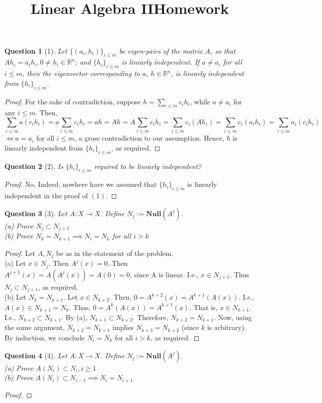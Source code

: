 \documentclass[11pt]{article}
\title{\vspace{-50pt}
\Huge \name
\\\vspace{20pt}
\huge Linear Algebra II\hfill Homework \hw}
\author{}
\date{}
\theoremstyle{quest}
\newtheorem*{question}{Question}
\begin{document}
\maketitle

\begin{question}[1]
Let $\{(a_i, h_i)\}_{i \le m}$ be eigen-pairs of the matrix $A$, so that $Ah_i = a_i h_i, 0 \ne h_i \in \mathbb{R}^n$; and $\{h_i\}_{i \le m}$ is linearly independent. If $a \ne a_i$ for all $i \le m$, then the eigenvector corresponding to $a$, $h \in \mathbb{R}^n$, is linearly independent from $\{h_i\}_{i \le m}$.
\end{question}
\begin{proof}
  For the sake of contradiction, suppose $h = \sum_{i \le m} c_i h_i$, while $a \ne a_i$ for any $i \le m$. Then,
  $$\sum_{i \le m} a (c_i h_i) = a \sum_{i \le m} c_i h_i = ah = Ah = A \sum_{i \le m} c_i h_i = \sum_{i \le m} c_i (A h_i) = \sum_{i \le m} c_i (a_i h_i) = \sum_{i \le m} a_i (c_i h_i)$$ $\iff a = a_i$ for all $i \le m$, a gross contradiction to our assumption. Hence, $h$ is linearly independent from $\{h_i\}_{i \le m}$, as required.
\end{proof}

\begin{question}[2]
Is $\{h_i\}_{i \le m}$ required to be linearly independent?
\end{question}
\begin{proof}
  No. Indeed, nowhere have we assumed that $\{h_i\}_{i \le m}$ is linearly independent in the proof of $(1)$.
\end{proof}

\begin{question}[3]
Let $A: X \rightarrow X$. Define $N_j := \mathbf{Null}(A^j)$.
\\(a) Prove $N_j \subset N_{j+1}$
\\(b) Prove $N_k = N_{k+1} \implies N_i = N_k$ for all $i > k$
\end{question}
\begin{proof}
  Let $A, N_j$ be as in the statement of the problem.
  \\(a) Let $x \in N_j$. Then $A^j(x) = 0$. Then $A^{j+1}(x) = A(A^j(x)) = A(0) = 0$, since A is linear. I.e., $x \in N_{j+1}$. Thus $N_j \subset N_{j+1}$, as required.
  \\(b) Let $N_k = N_{k+1}$. Let $x \in N_{k+2}$. Then, $0 = A^{k+2}(x) = A^{k+1}(A(x))$. I.e., $A(x) \in N_{k+1} = N_k$. Thus, $0 = A^k(A(x)) = A^{k+1}(x)$. That is, $x \in N_{k+1}$. I.e., $N_{k+2} \subset N_{k+1}$. By (a), $N_{k+1} \subset N_{k+2}$. Therefore, $N_{k+2} = N_{k+1}$. Now, using the same argument, $N_{k+2} = N_{k+1}$ implies $N_{k+3} = N_{k+2}$ (since $k$ is arbitrary). By induction, we conclude $N_i = N_k$ for all $i > k$, as required.
\end{proof}

\begin{question}[4]
Let $A: X \rightarrow X$. Define $N_j := \mathbf{Null}(A^j)$.
\\(a) Prove $A(N_i) \subset N_i, i \ge 1$
\\(b) Prove $A(N_i) \subset N_{i-1} \implies N_i = N_{i+1}$
\end{question}
\begin{proof}

\end{proof}
\end{document}
